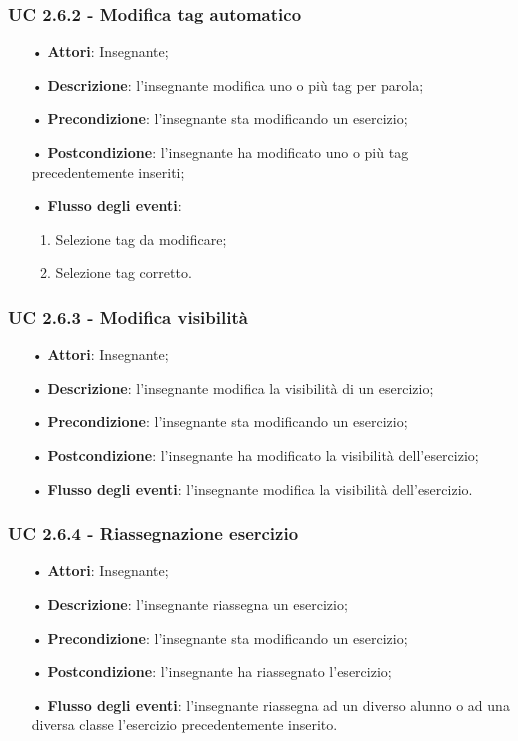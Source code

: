 \subsubsection{UC 2.6.2 - Modifica tag automatico}
\begin{itemize}
	\item[•] \textbf{Attori}: Insegnante;
	\item[•] \textbf{Descrizione}: l'insegnante modifica uno o più tag per parola;
	\item[•] \textbf{Precondizione}: l'insegnante sta modificando un esercizio;
	\item[•] \textbf{Postcondizione}: l'insegnante ha modificato uno o più tag precedentemente inseriti;
\item[•] \textbf{Flusso degli eventi}:
\begin{enumerate}
		\item Selezione tag da modificare;
		\item Selezione tag corretto.
\end{enumerate}
\end{itemize}


\subsubsection{UC 2.6.3 - Modifica visibilità} 
\begin{itemize}
	\item[•] \textbf{Attori}: Insegnante;
	\item[•] \textbf{Descrizione}: l'insegnante modifica la visibilità di un esercizio;
	\item[•] \textbf{Precondizione}: l'insegnante sta modificando un esercizio;
	\item[•] \textbf{Postcondizione}: l'insegnante ha modificato la visibilità dell'esercizio;
	\item[•] \textbf{Flusso degli eventi}: l'insegnante modifica la visibilità dell'esercizio.
\end{itemize}


\subsubsection{UC 2.6.4 - Riassegnazione esercizio}
\begin{itemize}
	\item[•] \textbf{Attori}: Insegnante;
	\item[•] \textbf{Descrizione}: l'insegnante riassegna un esercizio;
	\item[•] \textbf{Precondizione}:  l'insegnante sta modificando un esercizio;
	\item[•] \textbf{Postcondizione}: l'insegnante ha riassegnato l'esercizio;
	\item[•] \textbf{Flusso degli eventi}: l'insegnante riassegna ad un diverso alunno o ad una diversa classe l'esercizio precedentemente inserito.
\end{itemize}


